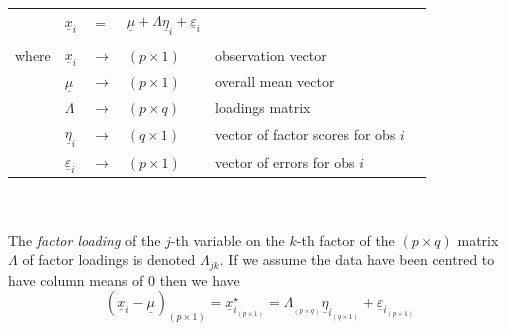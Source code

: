 \documentclass[a4paper,12pt,fleqn]{article}
\numberwithin{equation}{section}
\begin{document}
\noindent\begin{tabular}{l l l l l l}
& $\underline{x}_i$ & $=$ & $\underline{\mu} + \Lambda\underline{\eta}_i + \underline{\varepsilon}_i$&\\
	\\
	where  & $\underline{x}_i$ & $\rightarrow$ & $\left(p \times 1\right)$ & observation vector \\
	& $\underline{\mu}$ &  $\rightarrow$ & $\left(p \times 1\right)$  & overall mean vector \\
	& $\Lambda$ &  $\rightarrow$ & $\left(p \times q\right)$  & loadings matrix \\
	& $\underline{\eta}_i$ &  $\rightarrow$ & $\left(q \times 1\right)$  & vector of factor scores for obs $i$ \\
	& $\underline{\varepsilon}_i$ & $\rightarrow$ & $\left(p \times 1\right)$  & vector of errors for obs $i$ \\
\end{tabular}
\\ \\
The \textit{factor loading} of the $j$-th variable on the $k$-th factor of the $\left(p \times q\right)$ matrix $\Lambda$ of factor loadings is denoted $\Lambda_{jk}$. If we assume the data have been centred to have column means of 0 then we have
\begin{equation}
\label{eq:1}
\left(\underline{x}_i - \underline{\mu}_{}\right)_{\left(p \times 1\right)} = \underline{x}_{i_{\left(p \times 1\right)}}^\star = \Lambda_{_{\left(p \times q\right)}}\underline{\eta}_{i_{\left(q \times 1\right)}} + \underline{\varepsilon}_{i_{\left(p \times 1\right)}}
\end{equation}
\end{document}
